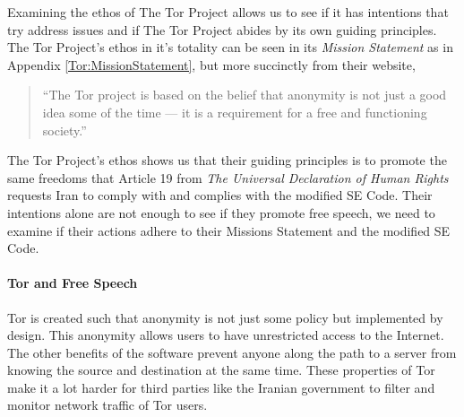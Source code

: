 \documentclass[11pt]{article}
\begin{document}
\begin{multicols}{2}
Examining the ethos of The Tor Project allows us to see if it has 
intentions that try address issues and if The Tor Project abides by its own guiding principles. The Tor
Project's ethos in it's totality can be seen in its \textit{Mission Statement}
as in Appendix \ref{Tor:MissionStatement}, but more succinctly from their website,
\begin{quotation}  
  ``The Tor project is based on the belief that anonymity is not just a good
  idea some of the time — it is a requirement for a free and functioning
  society.''\cite{Tor:Users}
\end{quotation}
The Tor Project's ethos shows us that their guiding principles is to promote
the same freedoms that Article 19 from \textit{The Universal Declaration of Human Rights}
requests Iran to comply with and complies with the modified SE Code. Their
intentions alone are not enough to see if they promote free speech, we need to
examine if their actions adhere to their Missions Statement and the modified SE
Code.


\paragraph{Tor and Free Speech}

Tor is created such that anonymity is not just some policy but implemented by
design. This anonymity allows users to have unrestricted access to the Internet.
The other benefits of the software prevent anyone along the path to a server
from knowing the source and destination at the same time. These properties of
Tor make it a lot harder for third parties like the Iranian government to filter
and monitor network traffic of Tor users.


\end{multicols}
\end{document}
